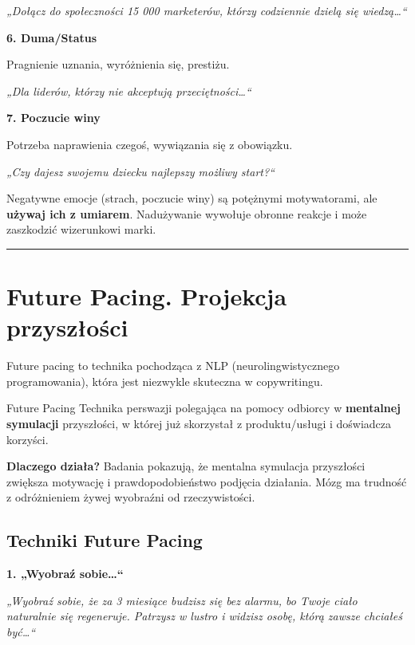 \documentclass[
  12pt,
  a4paper,
  twoside,
  openright,
  12pt,
  DIV=12,
  BCOR=12mm]{scrbook}
\newcommand{\decoline}{%
  \begin{center}
    \textcolor{bordergray}{\rule{0.3\textwidth}{0.5pt}}
  \end{center}
}
\begin{document}
\emph{„Dołącz do społeczności 15 000 marketerów, którzy codziennie
dzielą się wiedzą\ldots``}

\textbf{6. Duma/Status}

Pragnienie uznania, wyróżnienia się, prestiżu.

\emph{„Dla liderów, którzy nie akceptują przeciętności\ldots``}

\textbf{7. Poczucie winy}

Potrzeba naprawienia czegoś, wywiązania się z obowiązku.

\emph{„Czy dajesz swojemu dziecku najlepszy możliwy start?{}``}

\begin{uwaga}
Negatywne emocje (strach, poczucie winy) są potężnymi motywatorami, ale \textbf{używaj ich z umiarem}. Nadużywanie wywołuje obronne reakcje i może zaszkodzić wizerunkowi marki.
\end{uwaga}

\decoline

\section{Future Pacing. Projekcja
przyszłości}\label{future-pacing.-projekcja-przyszux142oux15bci}

Future pacing to technika pochodząca z NLP (neurolingwistycznego
programowania), która jest niezwykle skuteczna w copywritingu.

\begin{pojecie}{Future Pacing}
Technika perswazji polegająca na pomocy odbiorcy w \textbf{mentalnej symulacji} przyszłości, w której już skorzystał z produktu/usługi i doświadcza korzyści.
\end{pojecie}

\textbf{Dlaczego działa?} Badania pokazują, że mentalna symulacja
przyszłości zwiększa motywację i prawdopodobieństwo podjęcia działania.
Mózg ma trudność z odróżnieniem żywej wyobraźni od rzeczywistości.

\subsection{Techniki Future Pacing}\label{techniki-future-pacing}

\textbf{1. „Wyobraź sobie\ldots``}

\emph{„Wyobraź sobie, że za 3 miesiące budzisz się bez alarmu, bo Twoje
ciało naturalnie się regeneruje. Patrzysz w lustro i widzisz osobę,
którą zawsze chciałeś być\ldots``}
\end{document}
